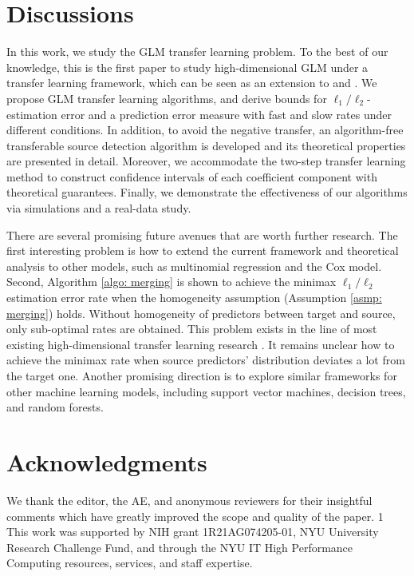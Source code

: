 \documentclass[12pt]{article}
\newcommand{\blind}{1}
\newcommand{\<}{\langle}
\renewcommand{\>}{\rangle}
\begin{document}
\section{Discussions}\label{sec:discussions}
In this work, we study the GLM transfer learning problem. To the best of our knowledge, this is the first paper to study high-dimensional GLM under a transfer learning framework, which can be seen as an extension to \cite{bastani2021predicting} and \cite{li2021transfer}. We propose GLM transfer learning algorithms, and derive bounds for $\ell_1/\ell_2$-estimation error and a prediction error measure with fast and slow rates under different conditions. In addition, to avoid the negative transfer, an algorithm-free transferable source detection algorithm is developed and its theoretical properties are presented in detail. Moreover, we accommodate the two-step transfer learning method to construct confidence intervals of each coefficient component with theoretical guarantees. Finally, we demonstrate the effectiveness of our algorithms via  simulations and a real-data study.

There are several promising future avenues that are worth further research. The first interesting problem is how to extend the current framework and theoretical analysis to other models, such as multinomial regression and the Cox model. Second, Algorithm \ref{algo: merging} is shown to achieve the minimax $\ell_1/\ell_2$ estimation error rate when the homogeneity assumption (Assumption \ref{asmp: merging}) holds. Without homogeneity of predictors between target and source, only sub-optimal rates are obtained. This problem exists in the line of most existing high-dimensional transfer learning research \citep{bastani2021predicting, li2021transfer, li2020transfer2}. It remains unclear how to achieve the minimax rate when source predictors' distribution deviates a lot from the target one. Another promising direction is to explore similar frameworks for other machine learning models, including support vector machines, decision trees, and random forests.  


\section*{Acknowledgments}
We thank the editor, the AE, and anonymous reviewers for their insightful comments which have greatly improved the scope and quality of the paper. \blind
{This work was supported by NIH grant 1R21AG074205-01, NYU University Research Challenge Fund, and through the NYU IT High Performance Computing resources, services, and staff expertise.} \fi
\end{document}
